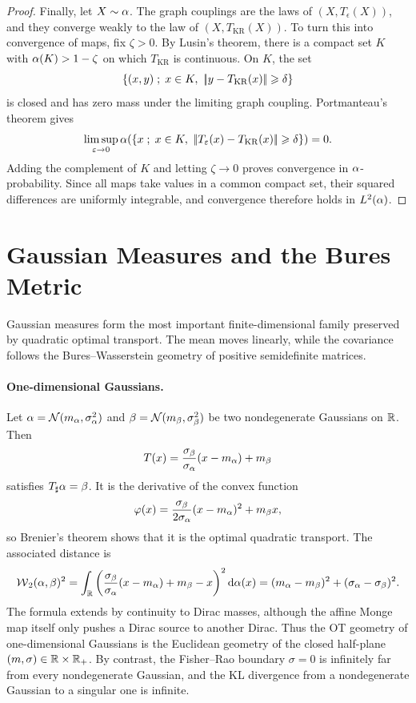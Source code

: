 \begin{proof}
	Finally, let $X\sim\alpha$. The graph couplings are the laws of $(X,T_\epsilon(X))$, and they converge weakly to the law of $(X,T_{\mathrm{KR}}(X))$. To turn this into convergence of maps, fix $\zeta>0$. By Lusin's theorem, there is a compact set $K$ with $\alpha(K)>1-\zeta$ on which $T_{\mathrm{KR}}$ is continuous. On $K$, the set
	\[
		\enscond{(x,y)}{x\in K,\ \norm{y-T_{\mathrm{KR}}(x)}\geq\delta}
	\]
	is closed and has zero mass under the limiting graph coupling. Portmanteau's theorem gives
	\[
		\limsup_{\epsilon\to0}
		\al\!\left(\enscond{x}{x\in K,\ \norm{T_\epsilon(x)-T_{\mathrm{KR}}(x)}\geq\delta}\right)
		=0.
	\]
	Adding the complement of $K$ and letting $\zeta\to0$ proves convergence in $\alpha$-probability. Since all maps take values in a common compact set, their squared differences are uniformly integrable, and convergence therefore holds in $L^2(\alpha)$.
\end{proof}

\section{Gaussian Measures and the Bures Metric}
\label{sec-gaussian-bures}

Gaussian measures form the most important finite-dimensional family preserved by quadratic optimal transport. The mean moves linearly, while the covariance follows the Bures--Wasserstein geometry of positive semidefinite matrices.

\paragraph{One-dimensional Gaussians.}

Let $\alpha=\mathcal{N}(m_\alpha,\sigma_\alpha^2)$ and $\beta=\mathcal{N}(m_\beta,\sigma_\beta^2)$ be two nondegenerate Gaussians on $\mathbb{R}$. Then
\[
	T(x)=\frac{\sigma_\beta}{\sigma_\alpha}(x-m_\alpha)+m_\beta
\]
satisfies $T_\sharp\alpha=\beta$. It is the derivative of the convex function
\[
	\varphi(x)=\frac{\sigma_\beta}{2\sigma_\alpha}(x-m_\alpha)^2+m_\beta x,
\]
so Brenier's theorem shows that it is the optimal quadratic transport. The associated distance is
\[
	\operatorname{\mathcal{W}}_2(\alpha,\beta)^2
	=
	\int_{\mathbb{R}}\left(\frac{\sigma_\beta}{\sigma_\alpha}(x-m_\alpha)+m_\beta-x\right)^2\mathrm{d}\alpha(x)
	=
	(m_\alpha-m_\beta)^2+(\sigma_\alpha-\sigma_\beta)^2.
\]
The formula extends by continuity to Dirac masses, although the affine Monge map itself only pushes a Dirac source to another Dirac. Thus the OT geometry of one-dimensional Gaussians is the Euclidean geometry of the closed half-plane $(m,\sigma)\in\mathbb{R}\times\mathbb{R}_+$. By contrast, the Fisher--Rao boundary $\sigma=0$ is infinitely far from every nondegenerate Gaussian, and the KL divergence from a nondegenerate Gaussian to a singular one is infinite.

